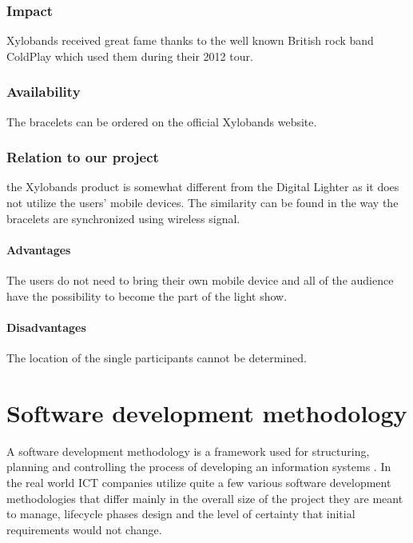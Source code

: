 \subsubsection{Impact}
Xylobands received great fame thanks to the well known British rock band ColdPlay which used them during their 2012 tour.

\subsubsection{Availability}
The bracelets can be ordered on the official Xylobands website.

\subsubsection{Relation to our project}
the Xylobands product is somewhat different from the Digital Lighter as it does not utilize the users' mobile devices. 
The similarity can be found in the way the bracelets are synchronized using wireless signal. 

\paragraph{Advantages}
The users do not need to bring their own mobile device and all of the audience have the possibility to become the part of the light show.

\paragraph{Disadvantages}
The location of the single participants cannot be determined.


\section{Software development methodology}
A software development methodology is a framework used for structuring, planning and controlling the process of developing an information systems \cite{selectingMethodology}. In the real world ICT companies utilize quite a few various software development methodologies that differ mainly in the overall size of the project they are meant to manage, lifecycle phases design and the level of certainty that initial requirements would not change.

